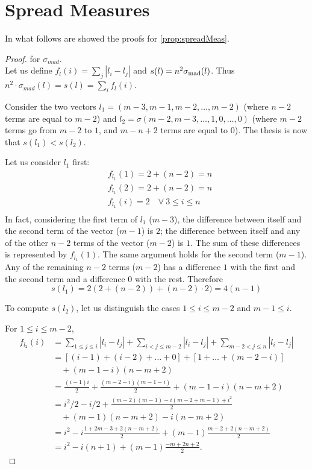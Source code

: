 \documentclass[version=3.21, pagesize, twoside=off, bibliography=totoc, DIV=calc, fontsize=12pt, a4paper]{scrartcl}
\begin{document}
\section{Spread Measures}
\label{apdx:proofSM}
In what follows are showed the proofs for \cref{prop:spreadMeas}.
\begin{proof} for $\sigma_{mad}$. \\
	Let us define $f_l(i)= \sum_{j}|l_i-l_j|$ and $s(l) = n^2 \sigma_\text{mad}(l)$. Thus $n^2 \cdot \sigma_{mad}(l) = s(l)= \sum_{i} f_l(i)$.
	
	Consider the two vectors $l_1=(m-3, m-1, m-2, \dots, m-2)$ (where $n-2$ terms are equal to $m-2$) and $l_2=\sigma(m-2, m-3, \dots, 1, 0, \dots, 0)$ (where $m-2$ terms go from $m-2$ to $1$, and $m-n+2$ terms are equal to $0$). 
	The thesis is now that $s(l_1) < s(l_2)$.
	
	Let us consider $l_1$ first: 
	\begin{align}
		&f_{l_1}(1)= 2+(n-2)=n \\
		&f_{l_1}(2)= 2+(n-2)=n \\
		&f_{l_1}(i)= 2 \quad \forall \ 3\leq i \leq n \\ 
	\end{align}
	In fact, considering the first term of $l_1$ ($m-3$), the difference between itself and the second term of the vector ($m-1$) is $2$; the difference between itself and any of the other $n-2$ terms of the vector ($m-2$) is $1$. The sum of these differences is represented by $f_{l_1}(1)$. The same argument holds for the second term ($m-1$). Any of the remaining $n-2$ terms ($m-2$) has a difference $1$ with the first and the second term and a difference $0$ with the rest. Therefore 
	\[s(l_1) =2(2+(n-2))+(n-2)\cdot2)= 4(n-1)\]
	
	To compute $s(l_2)$, let us distinguish the cases $1 ≤ i ≤ m - 2$ and $m - 1 ≤ i$.
	
	For $1 ≤ i ≤ m - 2$, 
	\begin{align}
		f_{l_2}(i) &= \sum_{1 ≤ j ≤ i} |l_i - l_j| + \sum_{i < j ≤ m - 2} |l_i - l_j| + \sum_{m - 2 < j ≤ n} |l_i - l_j|\\
		&= [(i - 1) + (i - 2) + … + 0] + [1 + … + (m - 2 - i)] \\
		&\quad + (m - 1 - i) (n - m + 2)\\
		&= \frac{(i - 1) i}{2} + \frac{(m - 2 - i) (m - 1 - i)}{2} + (m - 1 - i) (n - m + 2)\\
		&= i^2 / 2 - i / 2 + \frac{(m - 2) (m - 1) - i (m - 2 + m - 1) + i^2}{2} \\
		&\quad + (m - 1) (n - m + 2) - i (n - m + 2)\\
		&= i^2 - i \frac{1 + 2m - 3 + 2(n - m + 2)}{2} + (m - 1) \frac{m - 2 + 2 (n - m + 2)}{2}\\
		&= i^2 - i (n + 1) + (m - 1) \frac{-m + 2n + 2}{2}.
	\end{align}
	

\end{proof}
\end{document}
